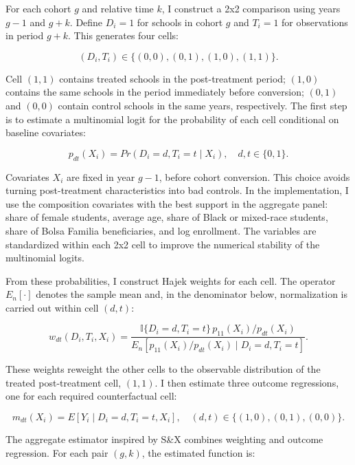 For each cohort $g$ and relative time $k$, I construct a 2x2 comparison using years $g-1$ and $g+k$. Define $D_i=1$ for schools in cohort $g$ and $T_i=1$ for observations in period $g+k$. This generates four cells:

\begin{equation}
(D_i,T_i) \in \{(0,0),(0,1),(1,0),(1,1)\}.
\end{equation}

Cell $(1,1)$ contains treated schools in the post-treatment period; $(1,0)$ contains the same schools in the period immediately before conversion; $(0,1)$ and $(0,0)$ contain control schools in the same years, respectively. The first step is to estimate a multinomial logit for the probability of each cell conditional on baseline covariates:

\begin{equation}
p_{dt}(X_i)=Pr(D_i=d,T_i=t \mid X_i), \quad d,t \in \{0,1\}.
\end{equation}

Covariates $X_i$ are fixed in year $g-1$, before cohort conversion. This choice avoids turning post-treatment characteristics into bad controls. In the implementation, I use the composition covariates with the best support in the aggregate panel: share of female students, average age, share of Black or mixed-race students, share of Bolsa Familia beneficiaries, and log enrollment. The variables are standardized within each 2x2 cell to improve the numerical stability of the multinomial logits.

From these probabilities, I construct Hajek weights for each cell. The operator $E_n[\cdot]$ denotes the sample mean and, in the denominator below, normalization is carried out within cell $(d,t)$:

\begin{equation}
w_{dt}(D_i,T_i,X_i)=
\frac{\mathbb{I}\{D_i=d,T_i=t\}\,p_{11}(X_i)/p_{dt}(X_i)}
{E_n[p_{11}(X_i)/p_{dt}(X_i) \mid D_i=d,T_i=t]}.
\end{equation}

These weights reweight the other cells to the observable distribution of the treated post-treatment cell, $(1,1)$. I then estimate three outcome regressions, one for each required counterfactual cell:

\begin{equation}
m_{dt}(X_i)=E[Y_i \mid D_i=d,T_i=t,X_i], \quad (d,t)\in\{(1,0),(0,1),(0,0)\}.
\end{equation}

The aggregate estimator inspired by S\&X combines weighting and outcome regression. For each pair $(g,k)$, the estimated function is:

